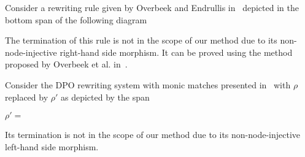\begin{example}[Limitation]
    \label{ex:overbeek:5d2:limitation}
    Consider a rewriting rule given by Overbeek and Endrullis in~\cite[Example 5.2]{overbeek2024termination_lmcs} depicted in the bottom span of the following diagram


    The termination of this rule is not in the scope of our method due to its non-node-injective right-hand side morphism. It can be proved using the method proposed by Overbeek et al. in~\cite{overbeek2024termination_lmcs}.
\end{example}
 
\begin{example}[Limitation]
  \label{ex:overbeek:5d6_bis:limitation} 
  Consider the DPO rewriting system with monic matches presented in~\cite[Example 5.6]{overbeek2024termination_lmcs} with $\rho$ replaced by $\rho'$ as depicted by the span 
  \begin{center}
    $\rho' = $\scalebox{0.9} { }
  \end{center} 

  Its termination is not in the scope of our method due to its non-node-injective left-hand side morphism. 
\end{example}